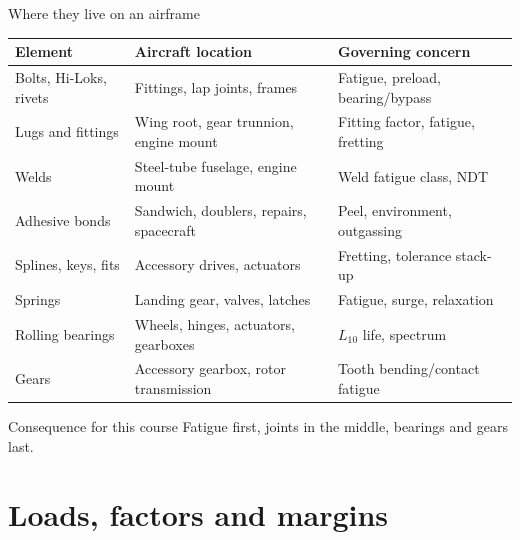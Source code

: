 \documentclass[aspectratio=169,10pt]{beamer}
\begin{document}
\begin{frame}{Where they live on an airframe}
\small
\begin{tabular}{@{}lll@{}}
\toprule
Element & Aircraft location & Governing concern \\
\midrule
Bolts, Hi-Loks, rivets & Fittings, lap joints, frames & Fatigue, preload, bearing/bypass \\
Lugs and fittings & Wing root, gear trunnion, engine mount & Fitting factor, fatigue, fretting \\
Welds & Steel-tube fuselage, engine mount & Weld fatigue class, NDT \\
Adhesive bonds & Sandwich, doublers, repairs, spacecraft & Peel, environment, outgassing \\
Splines, keys, fits & Accessory drives, actuators & Fretting, tolerance stack-up \\
Springs & Landing gear, valves, latches & Fatigue, surge, relaxation \\
Rolling bearings & Wheels, hinges, actuators, gearboxes & $L_{10}$ life, spectrum \\
Gears & Accessory gearbox, rotor transmission & Tooth bending/contact fatigue \\
\bottomrule
\end{tabular}
\vspace{4pt}
\begin{block}{Consequence for this course}
Fatigue first, joints in the middle, bearings and gears last.
\end{block}
\end{frame}



\section{Loads, factors and margins}
\end{document}
